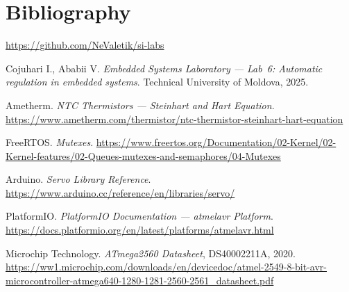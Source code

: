 \documentclass[12pt]{article}
\begin{document}
\section{Bibliography}

\begingroup
\makeatletter
\renewcommand{\section}[2]{}
\makeatother

\begin{thebibliography}{}

  \url{https://github.com/NeValetik/si-labs}

  Cojuhari I., Ababii V. \textit{Embedded Systems Laboratory --- Lab~6: Automatic regulation in embedded systems}.
  Technical University of Moldova, 2025.

  Ametherm. \textit{NTC Thermistors --- Steinhart and Hart Equation}.
  \url{https://www.ametherm.com/thermistor/ntc-thermistor-steinhart-hart-equation}

  FreeRTOS. \textit{Mutexes}.
  \url{https://www.freertos.org/Documentation/02-Kernel/02-Kernel-features/02-Queues-mutexes-and-semaphores/04-Mutexes}

  Arduino. \textit{Servo Library Reference}.
  \url{https://www.arduino.cc/reference/en/libraries/servo/}

  PlatformIO. \textit{PlatformIO Documentation --- atmelavr Platform}.
  \url{https://docs.platformio.org/en/latest/platforms/atmelavr.html}

  Microchip Technology. \textit{ATmega2560 Datasheet}, DS40002211A, 2020.
  \url{https://ww1.microchip.com/downloads/en/devicedoc/atmel-2549-8-bit-avr-microcontroller-atmega640-1280-1281-2560-2561_datasheet.pdf}

\end{thebibliography}
\endgroup

\pagebreak
\end{document}

